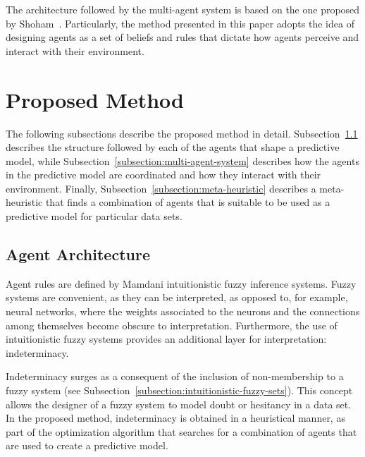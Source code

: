 \documentclass{ieeeaccess}
\begin{document}
The architecture followed by the multi-agent system is based on the one proposed
by Shoham~\cite{Shoham1993}. Particularly, the method presented in this paper
adopts the idea of designing agents as a set of beliefs and rules that dictate
how agents perceive and interact with their environment.

\section{Proposed Method}
\label{section:proposed-method}


The following subsections describe the proposed method in
detail. Subsection~\ref{subsection:agent-architecture} describes the structure
followed by each of the agents that shape a predictive model, while
Subsection~\ref{subsection:multi-agent-system} describes how the agents in the
predictive model are coordinated and how they interact with their
environment. Finally, Subsection~\ref{subsection:meta-heuristic} describes a
meta-heuristic that finds a combination of agents that is suitable to be used
as a predictive model for particular data sets.

\subsection{Agent Architecture}
\label{subsection:agent-architecture}

Agent rules are defined by Mamdani intuitionistic fuzzy inference systems. Fuzzy systems
are convenient, as they can be interpreted, as opposed to, for example, neural
networks, where the weights associated to the neurons and the connections among
themselves become obscure to interpretation. Furthermore, the use of
intuitionistic fuzzy systems provides an additional layer for interpretation:
indeterminacy.

Indeterminacy surges as a consequent of the inclusion of non-membership to a
fuzzy system (see Subsection~\ref{subsection:intuitionistic-fuzzy-sets}). This
concept allows the designer of a fuzzy system to model doubt or hesitancy in a
data set. In the proposed method, indeterminacy is obtained in a heuristical
manner, as part of the optimization algorithm that searches for a combination of
agents that are used to create a predictive model.
\end{document}
